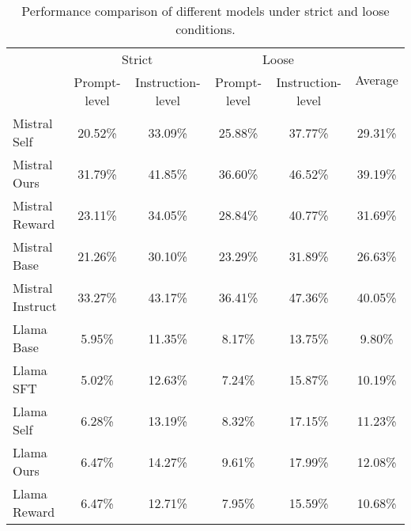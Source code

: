 \begin{table*}[h]
    \centering
    \begin{tabular}{lccccc}
        \toprule
        & \multicolumn{2}{c}{Strict} & \multicolumn{2}{c}{Loose} & \multirow{2}{*}{Average} \\
        \cmidrule(lr){2-3} \cmidrule(lr){4-5}
        & Prompt-level & Instruction-level & Prompt-level & Instruction-level & \\
        \midrule
        Mistral Self     & 20.52\% & 33.09\% & 25.88\% & 37.77\% & 29.31\% \\
        Mistral Ours     & 31.79\% & 41.85\% & 36.60\% & 46.52\% & 39.19\% \\
        Mistral Reward   & 23.11\% & 34.05\% & 28.84\% & 40.77\% & 31.69\% \\
        Mistral Base     & 21.26\% & 30.10\% & 23.29\% & 31.89\% & 26.63\% \\
        Mistral Instruct & 33.27\% & 43.17\% & 36.41\% & 47.36\% & 40.05\% \\
        \midrule
        Llama Base       & 5.95\%  & 11.35\% & 8.17\% & 13.75\% & 9.80\% \\
        Llama SFT        & 5.02\%  & 12.63\% & 7.24\%  & 15.87\% & 10.19\% \\
        Llama Self       & 6.28\%  & 13.19\% & 8.32\%  & 17.15\% & 11.23\% \\
        Llama Ours       & 6.47\%  & 14.27\% & 9.61\%  & 17.99\% & 12.08\% \\
        Llama Reward     & 6.47\%  & 12.71\% & 7.95\%  & 15.59\% & 10.68\% \\
        \bottomrule
    \end{tabular}
    \caption{Performance comparison of different models under strict and loose conditions.}
    \label{if_eval}
\end{table*}